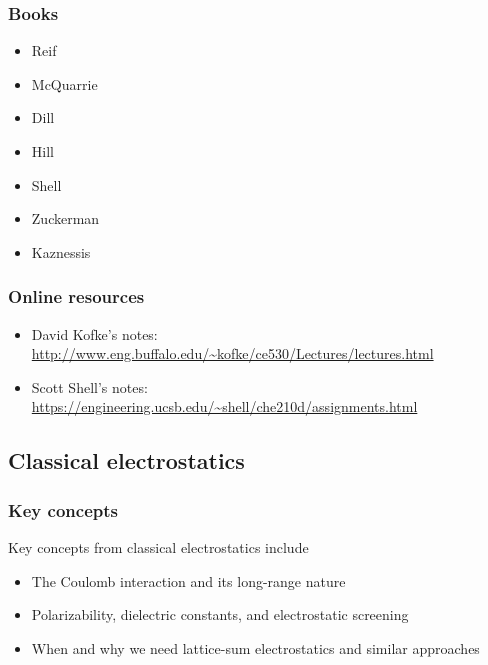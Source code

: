 \documentclass[9pt,bestpractices]{livecoms}
\begin{document}
\subsubsection{Books}
\begin{itemize}
\item Reif
\item McQuarrie
\item Dill
\item Hill
\item Shell
\item Zuckerman
\item Kaznessis
\end{itemize}


\subsubsection{Online resources}
\begin{itemize}
\item David Kofke's notes: \url{http://www.eng.buffalo.edu/~kofke/ce530/Lectures/lectures.html}
\item Scott Shell's notes: \url{https://engineering.ucsb.edu/~shell/che210d/assignments.html}
\end{itemize}

\subsection{Classical electrostatics}
\label{sec:classical_electrostatics}
\subsubsection{Key concepts}
Key concepts from classical electrostatics include
\begin{itemize}
\item The Coulomb interaction and its long-range nature
\item Polarizability, dielectric constants, and electrostatic screening
\item When and why we need lattice-sum electrostatics and similar approaches
\end{itemize}
\end{document}
